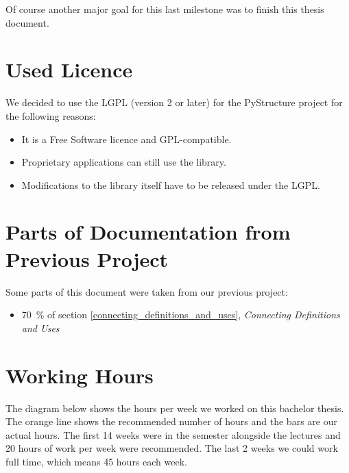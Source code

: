 \documentclass[12pt,halfparskip,DIV11,BCOR10mm]{scrreprt}
\begin{document}
Of course another major goal for this last milestone was to finish this thesis document.

\section{Used Licence}

We decided to use the LGPL (version 2 or later) for the PyStructure project for the following reasons:

\begin{itemize}
    \item It is a Free Software licence and GPL-compatible.
    \item Proprietary applications can still use the library.
    \item Modifications to the library itself have to be released under the LGPL.
\end{itemize}

\section{Parts of Documentation from Previous Project}

Some parts of this document were taken from our previous project:

\begin{itemize}
    \item 70~\% of section \vref{connecting_definitions_and_uses}, \emph{Connecting Definitions and Uses}
\end{itemize}

\section{Working Hours}

The diagram below shows the hours per week we worked on this bachelor thesis. The orange line shows the recommended number of hours and the bars are our actual hours. The first 14 weeks were in the semester alongside the lectures and 20 hours of work per week were recommended. The last 2 weeks we could work full time, which means 45 hours each week.
\end{document}
